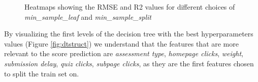 \documentclass{article}
\begin{document}
\begin{figure}%
    \centering
    \qquad
    \caption{Heatmaps showing the RMSE and R2 values for different choices of \textit{min\_sample\_leaf} and \textit{min\_sample\_split}}%
    \label{fig:heatmap}%
\end{figure}

By visualizing the first levels of the decision tree with the best hyperparameters values (Figure \ref{fig:dtstruct}) we understand that the features that are more relevant to the score prediction are \textit{assessment type}, \textit{homepage clicks}, \textit{weight}, \textit{submission delay}, \textit{quiz clicks}, \textit{subpage clicks}, as they are the first features chosen to split the train set on. \\
\end{document}
